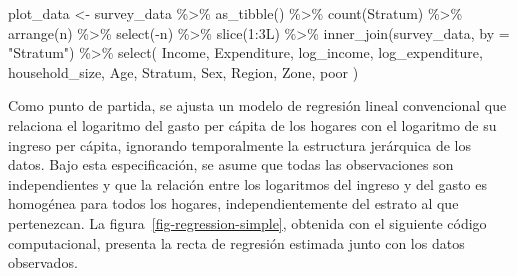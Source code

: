 \documentclass[
  spanish,
  11pt,
  letterpaper,
  oneside,
  open=any]{scrbook}
\newenvironment{Shaded}{\begin{snugshade}}{\end{snugshade}}
\newcommand{\AttributeTok}[1]{\textcolor[rgb]{0.40,0.45,0.13}{#1}}
\newcommand{\DecValTok}[1]{\textcolor[rgb]{0.68,0.00,0.00}{#1}}
\newcommand{\FunctionTok}[1]{\textcolor[rgb]{0.28,0.35,0.67}{#1}}
\newcommand{\NormalTok}[1]{\textcolor[rgb]{0.00,0.23,0.31}{#1}}
\newcommand{\OtherTok}[1]{\textcolor[rgb]{0.00,0.23,0.31}{#1}}
\newcommand{\SpecialCharTok}[1]{\textcolor[rgb]{0.37,0.37,0.37}{#1}}
\newcommand{\StringTok}[1]{\textcolor[rgb]{0.13,0.47,0.30}{#1}}
\begin{document}
\begin{Shaded}
\begin{Highlighting}[]
\NormalTok{plot\_data }\OtherTok{\textless{}{-}}\NormalTok{ survey\_data }\SpecialCharTok{\%\textgreater{}\%}
  \FunctionTok{as\_tibble}\NormalTok{() }\SpecialCharTok{\%\textgreater{}\%}
  \FunctionTok{count}\NormalTok{(Stratum) }\SpecialCharTok{\%\textgreater{}\%}
  \FunctionTok{arrange}\NormalTok{(n) }\SpecialCharTok{\%\textgreater{}\%}
  \FunctionTok{select}\NormalTok{(}\SpecialCharTok{{-}}\NormalTok{n) }\SpecialCharTok{\%\textgreater{}\%}
  \FunctionTok{slice}\NormalTok{(}\DecValTok{1}\SpecialCharTok{:}\DecValTok{3}\NormalTok{L) }\SpecialCharTok{\%\textgreater{}\%}
  \FunctionTok{inner\_join}\NormalTok{(survey\_data, }\AttributeTok{by =} \StringTok{"Stratum"}\NormalTok{) }\SpecialCharTok{\%\textgreater{}\%}
  \FunctionTok{select}\NormalTok{(}
\NormalTok{    Income,}
\NormalTok{    Expenditure,}
\NormalTok{    log\_income,}
\NormalTok{    log\_expenditure,}
\NormalTok{    household\_size,}
\NormalTok{    Age,}
\NormalTok{    Stratum,}
\NormalTok{    Sex,}
\NormalTok{    Region,}
\NormalTok{    Zone,}
\NormalTok{    poor}
\NormalTok{  )}
\end{Highlighting}
\end{Shaded}

Como punto de partida, se ajusta un modelo de regresión lineal
convencional que relaciona el logaritmo del gasto per cápita de los
hogares con el logaritmo de su ingreso per cápita, ignorando
temporalmente la estructura jerárquica de los datos. Bajo esta
especificación, se asume que todas las observaciones son independientes
y que la relación entre los logaritmos del ingreso y del gasto es
homogénea para todos los hogares, independientemente del estrato al que
pertenezcan. La figura~\ref{fig-regression-simple}, obtenida con el
siguiente código computacional, presenta la recta de regresión estimada
junto con los datos observados.
\end{document}

